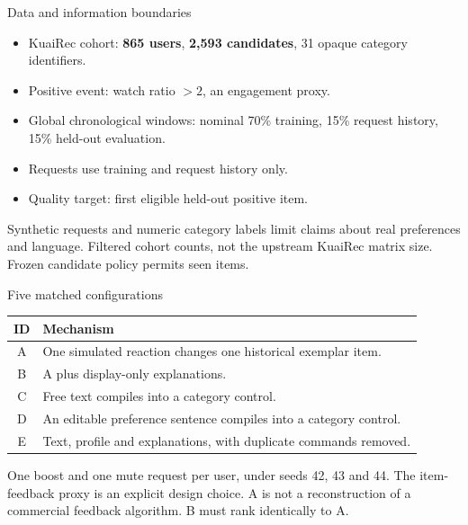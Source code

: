\documentclass[10pt]{beamer}
\newcommand{\toprule}{\hline}
\newcommand{\midrule}{\hline}
\newcommand{\bottomrule}{\hline}
\newcommand{\src}[1]{\vfill{\tiny\color{bcitgray}#1}}
\begin{document}
\begin{frame}{Data and information boundaries}
\begin{itemize}
\item KuaiRec cohort: \textbf{865 users}, \textbf{2,593 candidates}, 31 opaque category identifiers.
\item Positive event: watch ratio $>2$, an engagement proxy.
\item Global chronological windows: nominal 70\% training, 15\% request history, 15\% held-out evaluation.
\item Requests use training and request history only.
\item Quality target: first eligible held-out positive item.
\end{itemize}
\vspace{0.2cm}
Synthetic requests and numeric category labels limit claims about real preferences and language.
\src{Filtered cohort counts, not the upstream KuaiRec matrix size. Frozen candidate policy permits seen items.}
\end{frame}

\begin{frame}{Five matched configurations}
\small
\begin{tabular}{@{}cP{8.9cm}@{}}
\toprule
ID & Mechanism\\\midrule
A & One simulated reaction changes one historical exemplar item.\\[0.15cm]
B & A plus display-only explanations.\\[0.15cm]
C & Free text compiles into a category control.\\[0.15cm]
D & An editable preference sentence compiles into a category control.\\[0.15cm]
E & Text, profile and explanations, with duplicate commands removed.\\\bottomrule
\end{tabular}\par
\vspace{0.25cm}
One boost and one mute request per user, under seeds 42, 43 and 44. The item-feedback proxy is an explicit design choice.
\src{A is not a reconstruction of a commercial feedback algorithm. B must rank identically to A.}
\end{frame}
\end{document}
